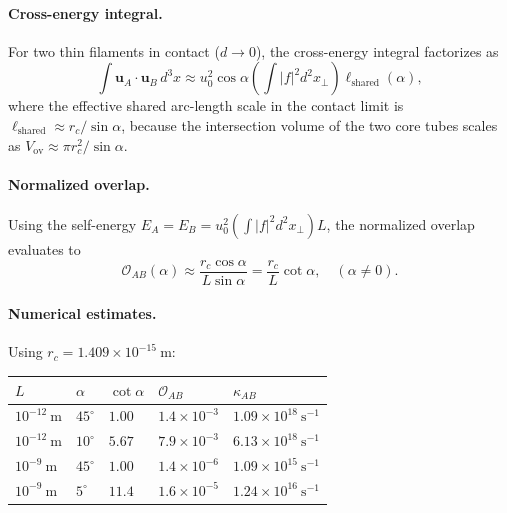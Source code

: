 \documentclass[11pt]{article}
\begin{document}
\paragraph{Cross-energy integral.} For two thin filaments in contact ($d \to 0$), the cross-energy integral factorizes as
\begin{equation}
    \int \mathbf{u}_A \cdot \mathbf{u}_B\, d^3x
    \approx u_0^2\cos\alpha \left(\int |f|^2 d^2x_\perp\right) \ell_{\mathrm{shared}}(\alpha),
\end{equation}
where the effective shared arc-length scale in the contact limit is $\ell_{\mathrm{shared}} \approx r_c/\sin\alpha$, because the intersection volume of the two core tubes scales as $V_{\mathrm{ov}} \approx \pi r_c^2/\sin\alpha$.

\paragraph{Normalized overlap.} Using the self-energy $E_A = E_B = u_0^2(\int|f|^2 d^2x_\perp)L$, the normalized overlap evaluates to
\begin{equation}
    \boxed{
        \mathcal{O}_{AB}(\alpha) \approx \frac{r_c\cos\alpha}{L\sin\alpha} = \frac{r_c}{L}\cot\alpha,
        \quad (\alpha \neq 0).
    }
    \label{eq:OAB_angled}
\end{equation}

\paragraph{Numerical estimates.} Using $r_c = 1.409\times 10^{-15}~\mathrm{m}$:

\begin{center}
\begin{tabular}{@{}lllll@{}}
    \toprule
    $L$ & $\alpha$ & $\cot\alpha$ & $\mathcal{O}_{AB}$ & $\kappa_{AB}$ \\
    \midrule
    $10^{-12}~\mathrm{m}$ & $45^\circ$ & $1.00$ & $1.4\times 10^{-3}$ & $1.09\times 10^{18}~\mathrm{s^{-1}}$\\
    $10^{-12}~\mathrm{m}$ & $10^\circ$ & $5.67$ & $7.9\times 10^{-3}$ & $6.13\times 10^{18}~\mathrm{s^{-1}}$\\
    $10^{-9}~\mathrm{m}$  & $45^\circ$ & $1.00$ & $1.4\times 10^{-6}$ & $1.09\times 10^{15}~\mathrm{s^{-1}}$\\
    $10^{-9}~\mathrm{m}$  & $5^\circ$  & $11.4$ & $1.6\times 10^{-5}$ & $1.24\times 10^{16}~\mathrm{s^{-1}}$\\
    \bottomrule
\end{tabular}
\end{center}
\end{document}
